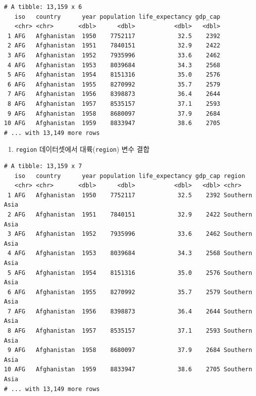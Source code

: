 \documentclass[
  11pt,
]{krantz}
\newenvironment{Shaded}{\begin{snugshade}}{\end{snugshade}}
\newcommand{\DataTypeTok}[1]{\textcolor[rgb]{0.27,0.27,0.27}{#1}}
\newcommand{\KeywordTok}[1]{\textcolor[rgb]{0.27,0.27,0.27}{\textbf{#1}}}
\newcommand{\NormalTok}[1]{#1}
\newcommand{\OperatorTok}[1]{\textcolor[rgb]{0.43,0.43,0.43}{\textbf{#1}}}
\newcommand{\StringTok}[1]{\textcolor[rgb]{0.5,0.5,0.5}{#1}}
\providecommand{\tightlist}{%
  \setlength{\itemsep}{0pt}\setlength{\parskip}{0pt}}
\begin{document}
\begin{verbatim}
# A tibble: 13,159 x 6
   iso   country      year population life_expectancy gdp_cap
   <chr> <chr>       <dbl>      <dbl>           <dbl>   <dbl>
 1 AFG   Afghanistan  1950    7752117            32.5    2392
 2 AFG   Afghanistan  1951    7840151            32.9    2422
 3 AFG   Afghanistan  1952    7935996            33.6    2462
 4 AFG   Afghanistan  1953    8039684            34.3    2568
 5 AFG   Afghanistan  1954    8151316            35.0    2576
 6 AFG   Afghanistan  1955    8270992            35.7    2579
 7 AFG   Afghanistan  1956    8398873            36.4    2644
 8 AFG   Afghanistan  1957    8535157            37.1    2593
 9 AFG   Afghanistan  1958    8680097            37.9    2684
10 AFG   Afghanistan  1959    8833947            38.6    2705
# ... with 13,149 more rows
\end{verbatim}

\normalsize

\begin{enumerate}
\def\labelenumi{\arabic{enumi}.}
\setcounter{enumi}{4}
\tightlist
\item
  \texttt{region} 데이터셋에서 대륙(\texttt{region}) 변수 결합
\end{enumerate}

\footnotesize

\begin{Shaded}
\end{Shaded}

\begin{verbatim}
# A tibble: 13,159 x 7
   iso   country      year population life_expectancy gdp_cap region       
   <chr> <chr>       <dbl>      <dbl>           <dbl>   <dbl> <chr>        
 1 AFG   Afghanistan  1950    7752117            32.5    2392 Southern Asia
 2 AFG   Afghanistan  1951    7840151            32.9    2422 Southern Asia
 3 AFG   Afghanistan  1952    7935996            33.6    2462 Southern Asia
 4 AFG   Afghanistan  1953    8039684            34.3    2568 Southern Asia
 5 AFG   Afghanistan  1954    8151316            35.0    2576 Southern Asia
 6 AFG   Afghanistan  1955    8270992            35.7    2579 Southern Asia
 7 AFG   Afghanistan  1956    8398873            36.4    2644 Southern Asia
 8 AFG   Afghanistan  1957    8535157            37.1    2593 Southern Asia
 9 AFG   Afghanistan  1958    8680097            37.9    2684 Southern Asia
10 AFG   Afghanistan  1959    8833947            38.6    2705 Southern Asia
# ... with 13,149 more rows
\end{verbatim}
\end{document}
